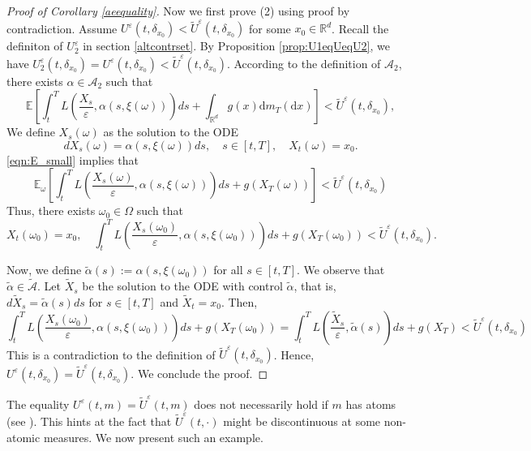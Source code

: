 \documentclass[reqno,11pt]{amsart}
\numberwithin{equation}{section}
\newcommand{\R}{\mathbb{R}} %
\newcommand{\e}{\varepsilon}
\newcommand{\nd}{\noindent}
\begin{document}
\begin{proof}[Proof of Corollary \ref{aeequality}]
Now we first prove (2) using proof by contradiction. Assume $U^\varepsilon(t,\delta_{x_0})<\widetilde{U}^\varepsilon(t,\delta_{x_0})$ for some $x_0\in \R^d$. Recall the definiton of $U^\varepsilon_2$ in section \ref{altcontrset}. By Proposition \ref{prop:U1eqUeqU2}, we have $U^\varepsilon_2(t,\delta_{x_0})=U^\varepsilon(t,\delta_{x_0})<\widetilde{U}^\varepsilon(t,\delta_{x_0})$. According to the definition of $\mathcal{A}_2$, there exists $\alpha\in \mathcal{A}_2$ such that
\begin{equation}\label{eqn:E_small}
\mathbb{E}\left[ \int_t^T L\left(\frac{X_s}{\varepsilon}, \alpha\left(s,\xi(\omega)\right)\right) ds + \int_{\mathbb{R}^d}g(x)\mathrm{d}m_T(\mathrm{d}x)\right] < \widetilde{U}^\varepsilon(t,\delta_{x_0}),
\end{equation}
We define $X_s(\omega)$ as the solution to the ODE \[dX_s(\omega)=\alpha\left(s,\xi(\omega)\right)ds,\quad s\in [t,T],\quad X_t(\omega)=x_0.\]
\eqref{eqn:E_small} implies that
\[
\mathbb{E}_{\omega}\left[ \int_t^T L\left(\frac{X_s(\omega)}{\varepsilon}, \alpha\left(s,\xi(\omega)\right)\right) ds + g(X_T(\omega))\right] < \widetilde{U}^\varepsilon(t,\delta_{x_0})
\]
Thus, there exists $\omega_0\in \Omega$ such that
\[X_t(\omega_0)=x_0,\quad \int_t^T L\left(\frac{X_s(\omega_0)}{\varepsilon}, \alpha\left(s,\xi(\omega_0)\right)\right) ds + g(X_T(\omega_0)) < \widetilde{U}^\varepsilon(t,\delta_{x_0}).\]

Now, we define $\tilde{\alpha}(s):=\alpha\left(s,\xi(\omega_0)\right)$ for all $s\in [t,T]$. We observe that $\tilde{\alpha}\in \widetilde{\mathcal{A}}$. Let $\tilde{X}_s$ be the solution to the ODE with control $\tilde{\alpha}$, that is, $d\tilde{X}_s=\tilde{\alpha}(s)ds$ for $s\in [t,T]$ and $\tilde{X}_t=x_0$. Then,
\[
\int_t^T L\left(\frac{X_s(\omega_0)}{\varepsilon}, \alpha\left(s,\xi(\omega_0)\right)\right) ds + g(X_T(\omega_0)) = \int_t^T L\left(\frac{\tilde X_s}{\varepsilon}, \tilde{\alpha}(s)\right) ds + g(X_T) < \widetilde{U}^\varepsilon(t,\delta_{x_0})
\]
This is a contradiction to the definition of $\widetilde{U}^\varepsilon(t,\delta_{x_0})$. Hence, $U^\varepsilon(t,\delta_{x_0})=\widetilde{U}^\varepsilon(t,\delta_{x_0})$. We conclude the proof.
\end{proof}

\nd
The equality $U^\e(t,m)=\widetilde{U}^\e(t,m)$ does not necessarily hold if $m$ has atoms (see \cite[Corollary 6.10]{CecchinDaudinJacksonMartini2025}). This hints at the fact that $\widetilde{U}^\e(t,\cdot)$ might be discontinuous at some non-atomic measures. We now present such an example.
    \vspace{2mm}
\end{document}
